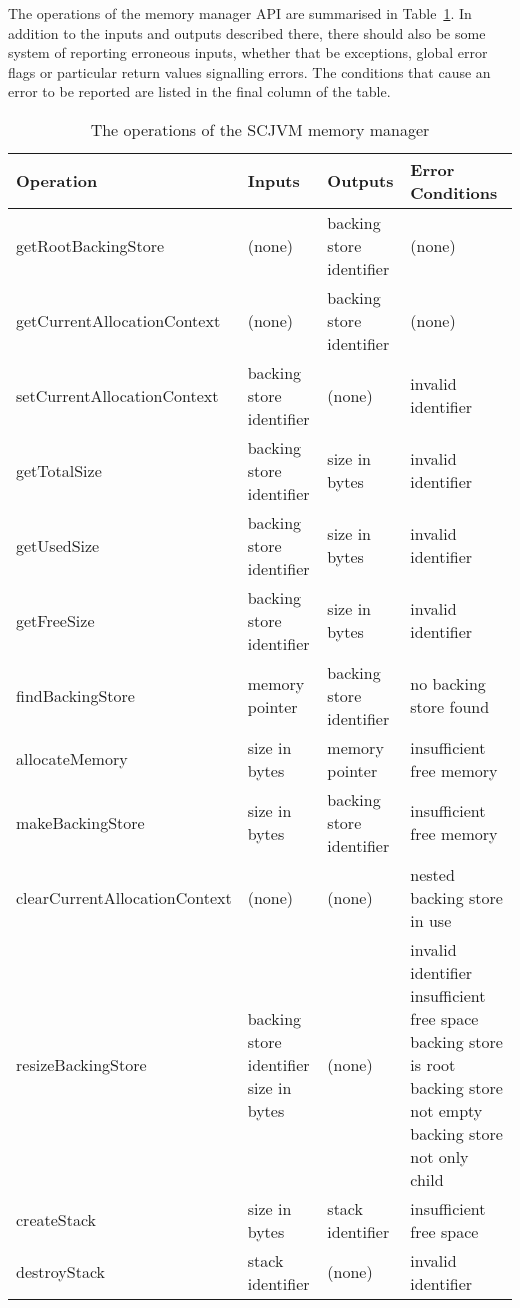 \documentclass[a4paper,10pt]{report}
\begin{document}
The operations of the memory manager API are summarised in
Table~\ref{memory-manager-table}. In addition to the inputs and outputs
described there, there should also be some system of reporting erroneous inputs,
whether that be exceptions, global error flags or particular return values
signalling errors. The conditions that cause an error to be reported are listed
in the final column of the table.

\begin{table}[ht]
  \centering
  \footnotesize
  \begin{tabular}{|l|p{3cm}|p{3cm}|p{3.6cm}|}
    Operation & Inputs & Outputs & Error Conditions \\
    \hline
    getRootBackingStore &
      (none) &
      backing store identifier &
      (none)
    \\getCurrentAllocationContext &
      (none) &
      backing store identifier &
      (none)
    \\setCurrentAllocationContext &
      backing store identifier &
      (none) &
      invalid identifier
    \\getTotalSize &
      backing store identifier &
      size in bytes &
      invalid identifier
    \\getUsedSize &
      backing store identifier &
      size in bytes &
      invalid identifier
    \\getFreeSize &
      backing store identifier &
      size in bytes &
      invalid identifier
    \\findBackingStore &
      memory pointer &
      backing store identifier &
      no backing store found
    \\allocateMemory &
      size in bytes &
      memory pointer &
      insufficient free memory
    \\makeBackingStore &
      size in bytes & 
      backing store identifier &
      insufficient free memory
    \\clearCurrentAllocationContext &
      (none) &
      (none) &
      nested backing store in use
    \\resizeBackingStore &
      backing store identifier \newline
      size in bytes &
      (none) &
      invalid identifier \newline
      insufficient free space \newline
      backing store is root \newline
      backing store not empty \newline
      backing store not only child
    \\createStack &
      size in bytes &
      stack identifier &
      insufficient free space
    \\destroyStack &
      stack identifier &
      (none) &
      invalid identifier
  \end{tabular}
  \caption{The operations of the SCJVM memory manager}
  \label{memory-manager-table}
\end{table}
\end{document}
